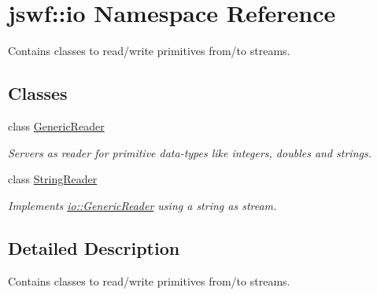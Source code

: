 \hypertarget{namespacejswf_1_1io}{\section{jswf\+:\+:io Namespace Reference}
\label{namespacejswf_1_1io}
}


Contains classes to read/write primitives from/to streams.  


\subsection*{Classes}
\begin{DoxyCompactItemize}
\item 
class \hyperlink{classjswf_1_1io_1_1_generic_reader}{Generic\+Reader}
\begin{DoxyCompactList}\small\item\em Servers as reader for primitive data-\/types like integers, doubles and strings. \end{DoxyCompactList}\item 
class \hyperlink{classjswf_1_1io_1_1_string_reader}{String\+Reader}
\begin{DoxyCompactList}\small\item\em Implements \hyperlink{classjswf_1_1io_1_1_generic_reader}{io\+::\+Generic\+Reader} using a string as stream. \end{DoxyCompactList}\end{DoxyCompactItemize}


\subsection{Detailed Description}
Contains classes to read/write primitives from/to streams. 